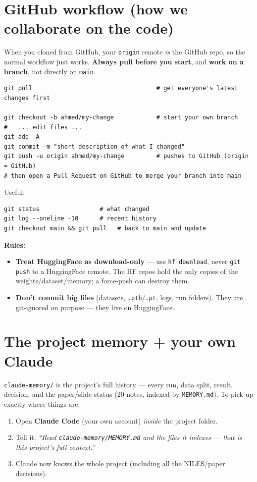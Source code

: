 \documentclass[11pt]{article}
\newcommand{\code}[1]{\lstinline[basicstyle=\ttfamily]|#1|}
\begin{document}
\section{GitHub workflow (how we collaborate on the code)}
When you cloned from GitHub, your \texttt{origin} remote \emph{is} the GitHub repo, so
the normal workflow just works. \textbf{Always pull before you start}, and \textbf{work
on a branch}, not directly on \texttt{main}.
\begin{lstlisting}
git pull                                   # get everyone's latest changes first

git checkout -b ahmed/my-change            # start your own branch
#   ... edit files ...
git add -A
git commit -m "short description of what I changed"
git push -u origin ahmed/my-change         # pushes to GitHub (origin = GitHub)
# then open a Pull Request on GitHub to merge your branch into main
\end{lstlisting}
Useful:
\begin{lstlisting}
git status                 # what changed
git log --oneline -10      # recent history
git checkout main && git pull   # back to main and update
\end{lstlisting}
\textbf{Rules:}
\begin{itemize}[nosep,leftmargin=1.4em]
\item \textbf{Treat HuggingFace as download-only} --- use \code{hf download}, never
      \texttt{git push} to a HuggingFace remote. The HF repos hold the only copies of
      the weights/dataset/memory; a force-push can destroy them.
\item \textbf{Don't commit big files} (datasets, \texttt{.pth}/\texttt{.pt}, logs, run
      folders). They are git-ignored on purpose --- they live on HuggingFace.
\end{itemize}

\section{The project memory + your own Claude}
\texttt{claude-memory/} is the project's full history --- every run, data split, result,
decision, and the paper/slide status (20 notes, indexed by \texttt{MEMORY.md}). To pick
up exactly where things are:
\begin{enumerate}[nosep,leftmargin=1.5em]
\item Open \textbf{Claude Code} (your own account) \emph{inside} the project folder.
\item Tell it: \emph{``Read \texttt{claude-memory/MEMORY.md} and the files it indexes ---
      that is this project's full context.''}
\item Claude now knows the whole project (including all the NILES/paper decisions).
\end{enumerate}
\end{document}
